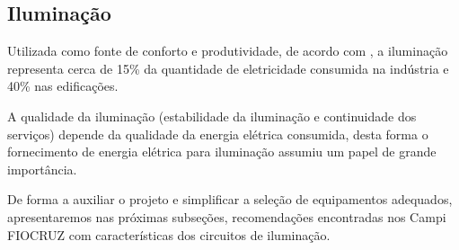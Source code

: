 \subsection{Iluminação} \label{section: lighting}
Utilizada como fonte de conforto e produtividade, de acordo com \cite{SchneiderGuide2015}, a iluminação representa cerca de 15\% da quantidade de eletricidade consumida na indústria e 40\% nas edificações.

A qualidade da iluminação (estabilidade da iluminação e continuidade dos serviços) depende da qualidade da energia elétrica consumida, desta forma o fornecimento de energia elétrica para iluminação assumiu um papel de grande importância.

De forma a auxiliar o projeto e simplificar a seleção de equipamentos adequados, apresentaremos nas próximas subseções, recomendações encontradas nos Campi FIOCRUZ com características dos circuitos de iluminação.






\newpage
